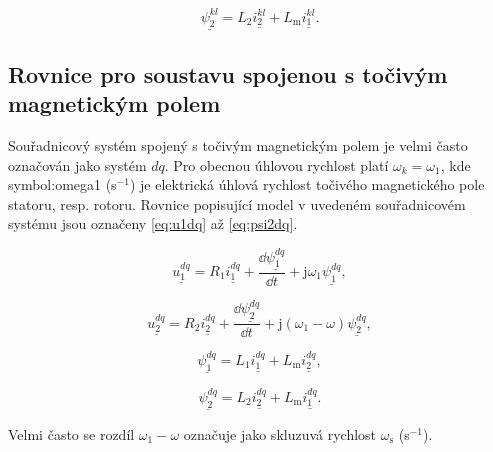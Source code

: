 \documentclass[a4paper, twoside, 11pt]{article}
\begin{document}
    \begin{equation}\label{eq:psi2kl}
        \underline{\psi_2^{kl}} = L_2 \underline{i_2^{kl}} + L_\text{m} \underline{i_1^{kl}}.
    \end{equation}

    \subsection{Rovnice pro soustavu spojenou s točivým magnetickým polem}
    Souřadnicový systém spojený s točivým magnetickým polem je velmi často označován jako systém $dq$. Pro obecnou úhlovou rychlost platí $\omega_k = \omega_1$, kde \gls{symbol:omega1} (s$^{-1}$) je elektrická úhlová rychlost točivého magnetického pole statoru, resp. rotoru.  Rovnice popisující model v uvedeném souřadnicovém systému jsou označeny \ref{eq:u1dq} až \ref{eq:psi2dq}.\par

 \begin{equation}\label{eq:u1dq}
     \underline{u_{1}^{dq}} = R_1 \underline{i_1^{dq}} + \frac{\dd{\underline{\psi_1^{dq}}}}{\dd{t}} + \text{j} \omega_1 \underline{\psi_1^{dq}},
    \end{equation}

    \begin{equation}
        \underline{u_{2}^{dq}} = R_2 \underline{i_2^{dq}} + \frac{\dd{\underline{\psi_2^{dq}}}}{\dd{t}} + \text{j} (\omega_1 - \omega) \underline{\psi_2^{dq}},
    \end{equation}

    \begin{equation}
        \underline{\psi_1^{dq}} = L_1 \underline{i_1^{dq}} + L_\text{m} \underline{i_2^{dq}},
    \end{equation}

    \begin{equation}\label{eq:psi2dq}
        \underline{\psi_2^{dq}} = L_2 \underline{i_2^{dq}} + L_\text{m} \underline{i_1^{dq}}.
    \end{equation}

    Velmi často se rozdíl $\omega_1 - \omega$ označuje jako skluzuvá rychlost $\omega_\text{s}$ (s$^{-1}$).
\end{document}

